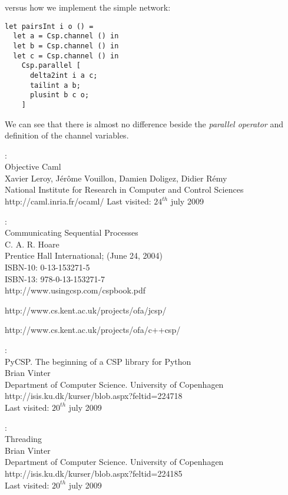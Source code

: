 \documentclass[a4paper,12pt]{article}
\begin{document}
versus how we implement the simple network:

\begin{verbatim}
let pairsInt i o () =
  let a = Csp.channel () in
  let b = Csp.channel () in
  let c = Csp.channel () in
    Csp.parallel [
      delta2int i a c;
      tailint a b;
      plusint b c o;
    ]
\end{verbatim}

We can see that there is almost no difference beside the {\it parallel operator}
and definition of the channel variables.

\newpage
\begin{thebibliography}{99}

:\\
Objective Caml\\
Xavier Leroy, Jérôme Vouillon, Damien Doligez, Didier Rémy\\
National Institute for Research in Computer and Control Sciences
http://caml.inria.fr/ocaml/
Last visited: $24^{th}$ july 2009

:\\
Communicating Sequential Processes\\
C. A. R. Hoare\\
Prentice Hall International; (June 24, 2004)\\
ISBN-10: 0-13-153271-5\\
ISBN-13: 978-0-13-153271-7\\
http://www.usingcsp.com/cspbook.pdf

http://www.cs.kent.ac.uk/projects/ofa/jcsp/

http://www.cs.kent.ac.uk/projects/ofa/c++csp/

:\\
PyCSP. The beginning of a CSP library for Python\\
Brian Vinter\\
Department of Computer Science. University of Copenhagen\\
http://isis.ku.dk/kurser/blob.aspx?feltid=224718\\
Last visited: $20^{th}$ july 2009

:\\
Threading\\
Brian Vinter\\
Department of Computer Science. University of Copenhagen\\
http://isis.ku.dk/kurser/blob.aspx?feltid=224185\\
Last visited: $20^{th}$ july 2009

\end{thebibliography}
\end{document}

